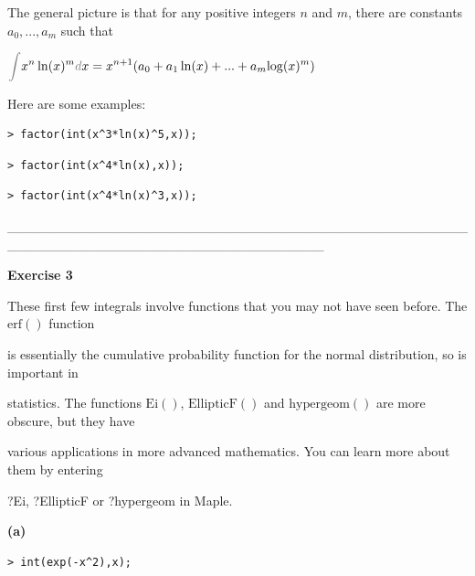 \documentclass{article}
\begin{document}
\begin{Maple Normal}

\end{Maple Normal}
\begin{Maple Normal}
The general picture is that for any positive integers 
$n$ and 
$m$, there are constants 
$a_{0},\mathit{...} ,a_{m}$ such that
\end{Maple Normal}
\begin{center}
$\displaystyle \textcolor{gray}{\int}x^{n} \ln (x)^{m}\textcolor{gray}{d}x =x^{n +1} (a_{0}+a_{1} \ln (x)+\mathit{...} +a_{m} \mathrm{log}(x)^{m})$\end{center}
\begin{Maple Normal}
Here are some examples:
\end{Maple Normal}
\begin{lstlisting}
> factor(int(x^3*ln(x)^5,x));
\end{lstlisting}
\begin{lstlisting}
> factor(int(x^4*ln(x),x));
\end{lstlisting}
\begin{lstlisting}
> factor(int(x^4*ln(x)^3,x));
\end{lstlisting}
\begin{Maple Normal}
\_\_\_\_\_\_\_\_\_\_\_\_\_\_\_\_\_\_\_\_\_\_\_\_\_\_\_\_\_\_\_\_\_\_\_\_\_\_\_\_\_\_\_\_\_\_\_\_\_\_\_\_\_\_\_\_\_\_\_\_\_\_\_\_\_\_\_\_\_\_\_\_\_\_\_\_\_\_\_\_\_
\end{Maple Normal}
\begin{Maple Normal}
\textbf{Exercise 3}
\end{Maple Normal}
\begin{Maple Normal}
These first few integrals involve functions that you may not have seen before.  The 
$\mathrm{erf}()$ function \

is essentially the cumulative probability function for the normal distribution, so is important in\

statistics.  The functions 
$\mathrm{Ei}()$, 
$\mathrm{EllipticF}()$ and 
$\mathrm{hypergeom}()$ are more obscure, but they have\

various applications in more advanced mathematics.  You can learn more about them by entering\

?Ei, ?EllipticF or ?hypergeom in Maple.
\end{Maple Normal}
\begin{Maple Normal}
\textbf{(a)}
\end{Maple Normal}
\begin{lstlisting}
> int(exp(-x^2),x);
\end{lstlisting}
\end{document}
